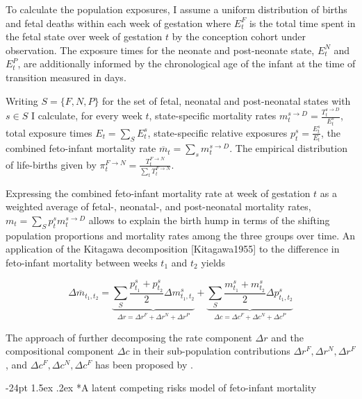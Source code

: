 \documentclass[10pt, twoside]{article}
\makeatletter
\renewcommand\subsection{\@startsection{subsection}{2}{\z@}%
                                     {-24pt}%
                                     {1.5ex \@plus .2ex}%
                                     {\normalfont\normalsize\bfseries}}
\makeatother
\begin{document}
To calculate the population exposures, I assume a uniform distribution of births and fetal deaths within each week of gestation where \(E_{t}^{F}\) is the total time spent in the fetal state over week of gestation \(t\) by the conception cohort under observation. The exposure times for the neonate and post-neonate state, \(E_{t}^{N}\) and \(E_{t}^{P}\), are additionally informed by the chronological age of the infant at the time of transition measured in days.

Writing \(S=\{F,N,P\}\) for the set of fetal, neonatal and post-neonatal states with \(s \in S\) I calculate, for every week \(t\), state-specific mortality rates \(m_{t}^{s\rightarrow D} = \frac {T_{t}^{s\rightarrow D}} {E_{t}^{s}}\), total exposure times \(E_{t} = \sum_{S} E_{t}^{s}\), state-specific relative exposures \(p_{t}^{s} = \frac {E_{t}^{s}} {E_t}\), the combined feto-infant mortality rate \(\overline{m}_t = \sum_{s} m_{t}^{s\rightarrow D}\). The empirical distribution of life-births given by \(\pi_{t}^{F\rightarrow N} = \frac { T_{t}^{F \rightarrow N} } {\sum_t T_{t}^{F \rightarrow N}}\).

Expressing the combined feto-infant mortality rate at week of gestation \(t\) as a weighted average of fetal-, neonatal-, and post-neonatal mortality rates, \(m_t = \sum_S p_{t}^{s} m_{t}^{s\rightarrow D}\) allows to explain the birth hump in terms of the shifting population proportions and mortality rates among the three groups over time. An application of the Kitagawa decomposition {[}Kitagawa1955{]} to the difference in feto-infant mortality between weeks \(t_1\) and \(t_2\) yields

\[
\Delta \overline{m}_{t_1, t_2} = \underbrace{
      \sum_S \frac{p_{t_1}^{s}+p_{t_2}^{s}}{2}\Delta m_{t_1,t_2}^{s}
    }_{
      \Delta r = \Delta r^F + \Delta r^N + \Delta r^P
    } +
    \underbrace{
      \sum_S \frac{m_{t_1}^{s}+m_{t_2}^{s}}{2}\Delta p_{t_1,t_2}^{s}
    }_{
      \Delta c = \Delta c^F + \Delta c^N + \Delta c^P
    }
\]

The approach of further decomposing the rate component \(\Delta r\) and the compositional component \(\Delta c\) in their sub-population contributions \(\Delta r^F, \Delta r^N, \Delta r^F\), and \(\Delta c^F, \Delta c^N, \Delta c^F\) has been proposed by \citep{Chevan2009}.

\hypertarget{a-latent-competing-risks-model-of-feto-infant-mortality}{%
\subsection*{A latent competing risks model of feto-infant mortality}\label{a-latent-competing-risks-model-of-feto-infant-mortality}}
\end{document}
